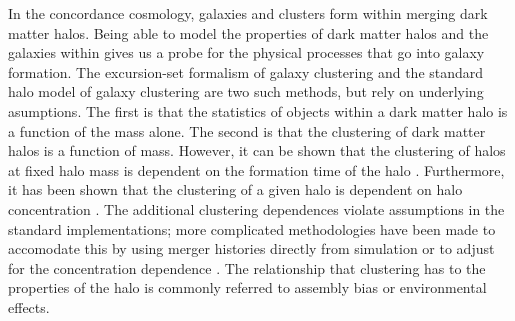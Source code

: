 \documentclass[usenatbib,usegraphicx,letterpaper]{mn2e}
\begin{document}
In the concordance cosmology, galaxies and clusters form within merging dark matter halos\citep{white78,
blumenthal84}. Being able to model the properties of dark matter halos and the galaxies within gives us a probe
for the physical processes that go into galaxy formation. The excursion-set formalism of galaxy clustering
\citep{bond91,lacey93,somerville99, zentner07} and the standard halo model of galaxy clustering \citep{seljak00,
peacock00, scoccimarro01, berlind02, bullock02, cooray02} are two such methods, but rely on underlying
asumptions. The first is that the statistics of objects within a dark matter halo is a function of the mass
alone. The second is that the clustering of dark matter halos is a function of mass. However, it can be shown
that the clustering of halos at fixed halo mass is dependent on the formation time of the halo \citep{wechsler02,
sheth04, gao05, wechsler06, croton07, zentner07}. Furthermore, it has been shown that the clustering of a given
halo is dependent on halo concentration \citep{wechsler02, wechsler06, mao15}.   The additional clustering dependences violate assumptions in the standard implementations; more
complicated methodologies have been made to accomodate this by using merger histories directly from simulation
\citep{dvorkin11} or to adjust for the concentration dependence \citep{gil11}. The relationship that clustering
has to the properties of the halo is commonly referred to assembly bias or environmental effects.
\end{document}

